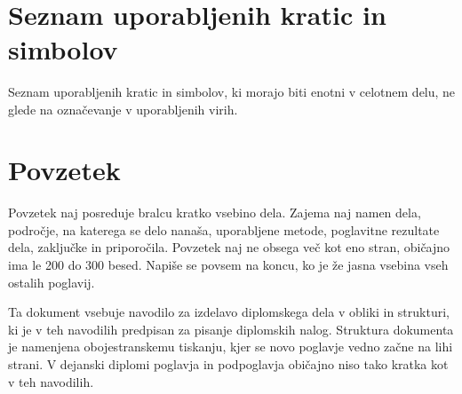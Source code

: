 \documentclass[12pt,a4paper]{book}
\begin{document}
\newpage


\ \thispagestyle{empty}

\newpage


\renewcommand\thepage{} 
\tableofcontents 
\renewcommand\thepage{\arabic{page}}

\thispagestyle{empty}



\chapter*{Seznam uporabljenih kratic in simbolov}

\thispagestyle{empty}

Seznam uporabljenih kratic in simbolov, ki morajo biti enotni v celotnem delu, ne glede na označevanje v uporabljenih virih.


\clearpage{\pagestyle{empty}\cleardoublepage}


\setcounter{page}{1}

\chapter*{Povzetek}


Povzetek naj posreduje bralcu kratko vsebino dela. Zajema naj namen dela, področje, na katerega se delo nanaša,
uporabljene metode, poglavitne rezultate dela, zaključke in priporočila. 
Povzetek naj ne obsega več kot eno stran, obi\v cajno ima le 200 do 300 besed. Napiše se povsem na koncu,
ko je že jasna vsebina vseh ostalih poglavij.

Ta dokument vsebuje navodilo za izdelavo diplomskega dela v obliki in strukturi, ki je v teh navodilih predpisan za
pisanje diplomskih nalog. Struktura dokumenta je namenjena obojestranskemu tiskanju, kjer se novo poglavje vedno za\v cne na lihi strani.
V dejanski diplomi poglavja in podpogla\-vja  obi\v cajno niso tako kratka kot v teh navodilih.
\end{document}
